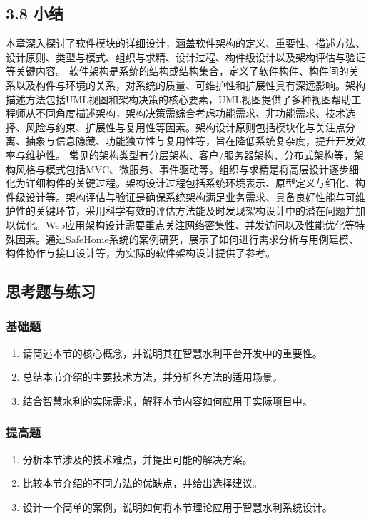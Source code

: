 \subsection{3.8 小结}\label{ux5c0fux7ed3} 本章深入探讨了软件模块的详细设计，涵盖软件架构的定义、重要性、描述方法、设计原则、类型与模式、组织与求精、设计过程、构件级设计以及架构评估与验证等关键内容。
软件架构是系统的结构或结构集合，定义了软件构件、构件间的关系以及构件与环境的关系，对系统的质量、可维护性和扩展性具有深远影响。架构描述方法包括UML视图和架构决策的核心要素，UML视图提供了多种视图帮助工程师从不同角度描述架构，架构决策需综合考虑功能需求、非功能需求、技术选择、风险与约束、扩展性与复用性等因素。架构设计原则包括模块化与关注点分离、抽象与信息隐藏、功能独立性与复用性等，旨在降低系统复杂度，提升开发效率与维护性。
常见的架构类型有分层架构、客户/服务器架构、分布式架构等，架构风格与模式包括MVC、微服务、事件驱动等。组织与求精是将高层设计逐步细化为详细构件的关键过程。架构设计过程包括系统环境表示、原型定义与细化、构件级设计等。架构评估与验证是确保系统架构满足业务需求、具备良好性能与可维护性的关键环节，采用科学有效的评估方法能及时发现架构设计中的潜在问题并加以优化。Web应用架构设计需要重点关注网络密集性、并发访问以及性能优化等特殊因素。通过SafeHome系统的案例研究，展示了如何进行需求分析与用例建模、构件协作与接口设计等，为实际的软件架构设计提供了参考。
\subsection{思考题与练习}\label{ux601dux8003ux9898ux4e0eux7ec3ux4e60-3} \subsubsection{基础题}\label{ux57faux7840ux9898-3}
\begin{enumerate} \def\labelenumi{\arabic{enumi}.} \tightlist \item 请简述本节的核心概念，并说明其在智慧水利平台开发中的重要性。 \item
总结本节介绍的主要技术方法，并分析各方法的适用场景。 \item 结合智慧水利的实际需求，解释本节内容如何应用于实际项目中。 \end{enumerate}
\subsubsection{提高题}\label{ux63d0ux9ad8ux9898-3} \begin{enumerate} \def\labelenumi{\arabic{enumi}.} \tightlist \item
分析本节涉及的技术难点，并提出可能的解决方案。 \item 比较本节介绍的不同方法的优缺点，并给出选择建议。 \item 设计一个简单的案例，说明如何将本节理论应用于智慧水利系统设计。 \end{enumerate}
